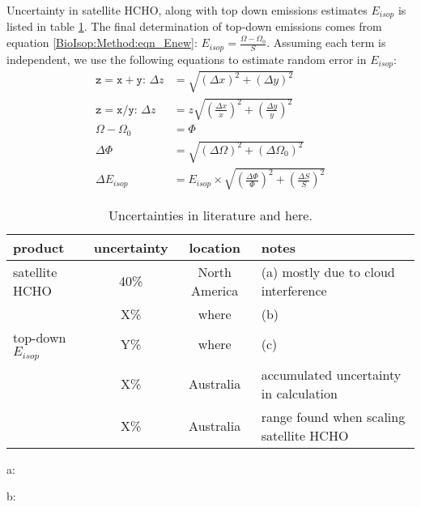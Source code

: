   Uncertainty in satellite HCHO, along with top down emissions estimates $E_{isop}$ is listed in table \ref{BioIsop:Uncertainty:tab_uncertainties}.
  The final determination of top-down emissions comes from equation \ref{BioIsop:Method:eqn_Enew}: $E_{isop}=\frac{\Omega - \Omega_{0}}{S}$.
  Assuming each term is independent, we use the following equations to estimate random error in $E_{isop}$:
  \begin{align*}
    \mathtt{z=x+y:} \, \Delta{z} & = \sqrt{(\Delta{x})^2 + (\Delta{y})^2} \\
    \mathtt{z=x/y:} \, \Delta{z} & = z \sqrt{(\frac{\Delta{x}}{x})^2 + (\frac{\Delta{y}}{y})^2} \\
    \Omega - \Omega_{0} & = \Phi \\
    \Delta{\Phi} & = \sqrt{(\Delta{\Omega})^2 + (\Delta{\Omega_{0}})^2} \\
    \Delta{E_{isop}} &= E_{isop} \times \sqrt{(\frac{\Delta{\Phi}}{\Phi})^2 + (\frac{\Delta{S}}{S})^2}
  \end{align*}
  \begin{table}\begin{threeparttable}
    \caption{Uncertainties in literature and here.}
    \begin{tabular}{ l | c  c  l } 
      \toprule
      product & uncertainty & location & notes \\
      \midrule
      satellite HCHO & 40\% & North America & (a) mostly due to cloud interference \\
       & X\% & where & (b) \\
      top-down $E_{isop}$ & Y\% & where & (c) \\
       & X\% & Australia & accumulated uncertainty in calculation \\
       & X\% & Australia & range found when scaling satellite HCHO \\
      \bottomrule
    \end{tabular}
    \begin{tablenotes} 
      \item a: \textcite{Millet2006,Palmer2006}
      \item b: 
    \end{tablenotes}
    \label{BioIsop:Uncertainty:tab_uncertainties}
  \end{threeparttable}\end{table}
  
